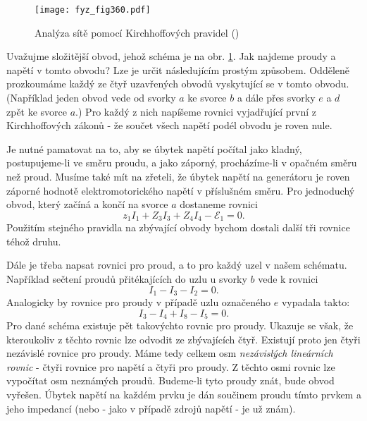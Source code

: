 {  \begin{figure}[ht!] %
    \centering
    \texttt{[image: fyz\_fig360.pdf]}
    \caption{Analýza sítě pomocí Kirchhoffových pravidel
             (\cite[s.~401]{Feynman02})}
    \label{fyz:fig360}
  \end{figure}
  
  Uvažujme složitější obvod, jehož schéma je na obr. \ref{fyz:fig360}. Jak najdeme proudy a napětí 
  v tomto obvodu? Lze je určit následujícím prostým způsobem. Odděleně prozkoumáme každý ze čtyř 
  uzavřených obvodů vyskytující se v tomto obvodu. (Například jeden obvod vede od svorky \(a\) ke 
  svorce \(b\) a dále přes svorky \(e\) a \(d\) zpět ke svorce \(a\).) Pro každý z nich napíšeme 
  rovnici vyjadřující první z Kirchhoffových zákonů - že součet všech napětí podél obvodu je roven 
  nule.
  
  Je nutné pamatovat na to, aby se úbytek napětí počítal jako kladný, postupujeme-li ve směru 
  proudu, a jako záporný, procházíme-li v opačném směru než proud. Musíme také mít na zřeteli, že 
  úbytek napětí na generátoru je roven záporné hodnotě elektromotorického napětí v příslušném 
  směru. Pro jednoduchý obvod, který začíná a končí na svorce \(a\) dostaneme rovnici
  \begin{equation*}
    z_1I_1 + Z_3I_3 + Z_4I_4 -\mathscr{E}_1 = 0.
  \end{equation*}
  Použitím stejného pravidla na zbývající obvody bychom dostali další tři rovnice téhož druhu. 
  
  Dále je třeba napsat rovnici pro proud, a to pro každý uzel v našem schématu. Například sečtení 
  proudů přitékajících do uzlu u svorky \(b\) vede k rovnici
  \begin{equation*}
    I_1 - I_3 - I_2 = 0.
  \end{equation*}
  Analogicky by rovnice pro proudy v případě uzlu označeného \(e\) vypadala takto:
  \begin{equation*}
    I_3 - I_4 + I_8 - I_5 = 0.
  \end{equation*}
  Pro dané schéma existuje pět takovýchto rovnic pro proudy. Ukazuje se však, že kteroukoliv z 
  těchto rovnic lze odvodit ze zbývajících čtyř. Existují proto jen čtyři nezávislé rovnice pro 
  proudy. Máme tedy celkem osm \emph{nezávislých lineárních rovnic} - čtyři rovnice pro napětí 
  a čtyři pro proudy. Z těchto osmi rovnic lze vypočítat osm neznámých proudů. Budeme-li tyto 
  proudy znát, bude obvod vyřešen. Úbytek napětí na každém prvku je dán součinem proudu tímto 
  prvkem a jeho impedancí (nebo - jako v případě zdrojů napětí - je už znám). 
  
}
